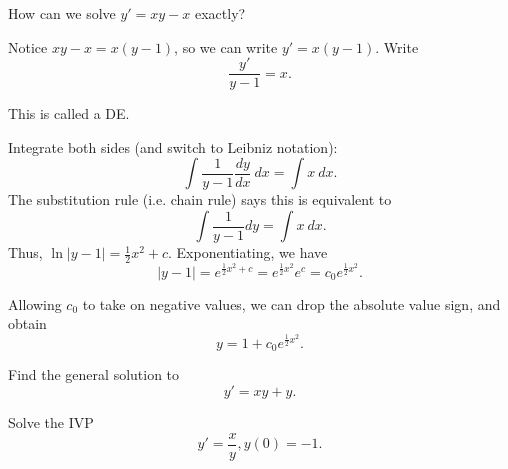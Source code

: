 \begin{applicationActivities}
\begin{observation}
\begin{center}\end{center}
\end{observation}

\begin{observation}
How can we solve \(y'=xy-x\) exactly?

\vfill
Notice \(xy-x=x(y-1)\), so we can write  \(y'=x(y-1)\).
\vfill
Write \[\frac{y'}{y-1} = x .\]

This is called a  DE.
\end{observation}

\begin{observation}
Integrate both sides (and switch to Leibniz notation):
\[ \int \frac{1}{y-1} \frac{dy}{dx}\ dx = \int x\ dx .\]
The substitution rule (i.e. chain rule) says this is equivalent to 
\[ \int \frac{1}{y-1} dy = \int x\ dx .\]
Thus, \(\ln|y-1|=\frac{1}{2}x^2+c\).  Exponentiating, we have
\[|y-1|=e^{\frac{1}{2}x^2+c}=e^{\frac{1}{2}x^2}{e^c}=c_0 e^{\frac{1}{2}x^2}.\]

Allowing \(c_0\) to take on negative values, we can drop the absolute value sign, and obtain 
\[y=1+c_0e^{\frac{1}{2}x^2}.\]
\end{observation}

\begin{activity}{10}
Find the general solution to \[y'=xy+y.\]
\end{activity}

\begin{activity}{10}
Solve the IVP \[y'=\frac{x}{y}, y(0)=-1.\]
\end{activity}

\end{applicationActivities}
